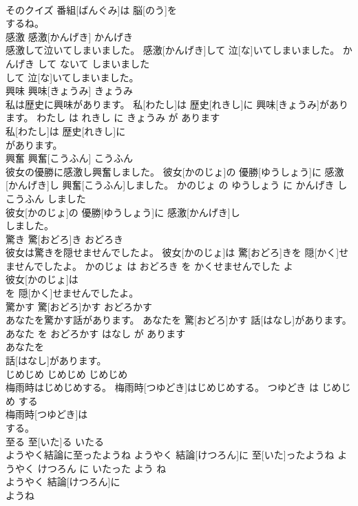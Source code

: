 \documentclass[8pt]{extreport}
\begin{document}
\begin{CJK}{UTF8}{min}
\\	そのクイズ 番組[ばんぐみ]は 脳[のう]を
\\	するね。			
\\	感激	感激[かんげき]	かんげき	
\\	感激して泣いてしまいました。	感激[かんげき]して 泣[な]いてしまいました。	かんげき して ないて しまいました	
\\	して 泣[な]いてしまいました。			
\\	興味	興味[きょうみ]	きょうみ	
\\	私は歴史に興味があります。	私[わたし]は 歴史[れきし]に 興味[きょうみ]があります。	わたし は れきし に きょうみ が あります	
\\	私[わたし]は 歴史[れきし]に
\\	があります。			
\\	興奮	興奮[こうふん]	こうふん	
\\	彼女の優勝に感激し興奮しました。	彼女[かのじょ]の 優勝[ゆうしょう]に 感激[かんげき]し 興奮[こうふん]しました。	かのじょ の ゆうしょう に かんげき し こうふん しました	
\\	彼女[かのじょ]の 優勝[ゆうしょう]に 感激[かんげき]し
\\	しました。			
\\	驚き	驚[おどろ]き	おどろき	
\\	彼女は驚きを隠せませんでしたよ。	彼女[かのじょ]は 驚[おどろ]きを 隠[かく]せませんでしたよ。	かのじょ は おどろき を かくせませんでした よ	
\\	彼女[かのじょ]は
\\	を 隠[かく]せませんでしたよ。			
\\	驚かす	驚[おどろ]かす	おどろかす	
\\	あなたを驚かす話があります。	あなたを 驚[おどろ]かす 話[はなし]があります。	あなた を おどろかす はなし が あります	
\\	あなたを
\\	話[はなし]があります。			
\\	じめじめ	じめじめ	じめじめ	
\\	梅雨時はじめじめする。	梅雨時[つゆどき]はじめじめする。	つゆどき は じめじめ する	
\\	梅雨時[つゆどき]は
\\	する。			
\\	至る	至[いた]る	いたる	
\\	ようやく結論に至ったようね	ようやく 結論[けつろん]に 至[いた]ったようね	ようやく けつろん に いたった よう ね	
\\	ようやく 結論[けつろん]に
\\	ようね			

\end{CJK}
\end{document}
